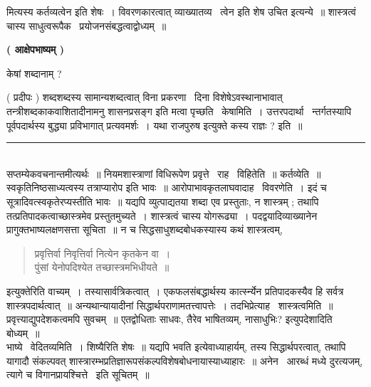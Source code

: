 \documentclass[11pt, openany]{book}
\begin{document}
\begin{multicols}{2}
\noindent
मित्यस्य {\qt कर्तव्यत्वेन} इति शेषः~। {\qt विवरणकारत्वात् व्याख्यातव्य \textendash\ त्वेन} इति शेष उचित इत्यन्ये~॥ शास्त्रत्वं चास्य साधुत्वरूपैक \textendash\ प्रयोजनसंबद्धत्वाद्वोध्यम्~॥

\begin{center}
\textbf{ ( आक्षेपभाष्यम् ) }
\end{center}

केषां शब्दानाम् ? 

 ( प्रदीपः ) शब्दशब्दस्य सामान्यशब्दत्वात् विना प्रकरणा \textendash\ दिना विशेषेऽवस्थानाभावात् तन्त्रीशब्दकाकवाशितादीनामनु शासनप्रसङ्ग इति मत्वा पृच्छति \textendash\ केषामिति~। उत्तरपदार्था \textendash\ न्तर्गतस्यापि पूर्वपदार्थस्य बुद्ध्या प्रविभागात् प्रत्यवमर्शः~। यथा राजपुरुष इत्युक्ते कस्य राज्ञः ? इति~॥

\noindent
\rule{1\linewidth}{0.5pt}\\

\noindent
सप्तम्येकवचनान्तमीत्यर्थः~॥ नियमशास्त्राणां विधिरूपेण प्रवृत्ते \textendash\ राह \textendash\ विहितेति~॥ कर्तव्येति~॥ स्वकृतिनिष्ठसाध्यत्वस्य तत्राप्यारोप इति भावः~॥ आरोपाभावकृतलाघवादाह \textendash\ विवरणेति~। इदं च सूत्रादिवत्स्वकृतेरप्यस्तीति भावः~॥ यद्यपि व्युत्पाद्यतया शब्दा एव प्रस्तुताः, न शास्त्रम् ; तथापि तत्प्रतिपादकत्वाच्छास्त्रमेव प्रस्तुतमुच्यते~। शास्त्रत्वं चास्य योगरूढ्या~। पदद्वयादिव्याख्यानेन प्रागुक्तभाष्यलक्षणसत्ता सूचिता~॥ न च सिद्धसाधुशब्दबोधकस्यास्य कथं शास्त्रत्वम्,

\begin{quote}
{\qt प्रवृत्तिर्वा निवृत्तिर्वा नित्येन कृतकेन वा~।\\
पुंसां येनोपदिश्येत तच्छास्त्रमभिधीयते~॥}
\end{quote}

इत्युक्तेरिति वाच्यम्~। तस्यासार्वत्रिकत्वात्~। एकफलसंबद्धार्थस्य कार्त्स्न्येन प्रतिपादकस्यैव हि सर्वत्र शास्त्रपदार्थत्वात्~॥ अन्यथान्यायादीनां सिद्धार्थपराणामतत्त्वापत्तेः~। तदभिप्रेत्याह \textendash\ शास्त्रत्वमिति~॥ प्रवृत्त्याद्युपदेशकत्वमपि सुवचम्~॥ एतद्वोधिताः साधवः, तैरेव भाषितव्यम्, नासाधुभिः? इत्युपदेशादिति बोध्यम्~॥\\

भाष्ये \textendash\ वेदितव्यमिति~। शिष्यैरिति शेषः~॥ यद्यपि {\qt भवति} इत्येवाध्याहार्यम्, तस्य सिद्धार्थपरत्वात्, तथापि यागादौ संकल्पवत् शास्त्रारम्भप्रतिज्ञारूपसंकल्पविशेषबोधनायास्याध्याहारः~॥ अनेन \textendash\ आरब्धं मध्ये दुरत्यजम्, त्यागे च विगानप्रायश्चित्ते \textendash\ इति सूचितम्~॥\\


\end{multicols}
\end{document}
